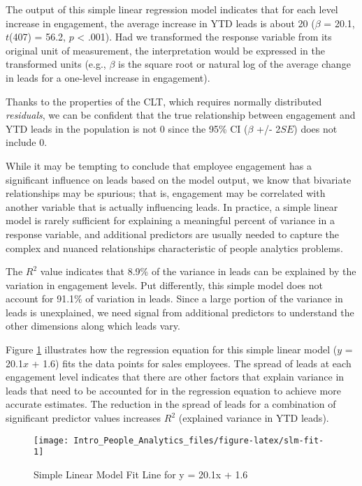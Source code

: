 \documentclass[
]{book}
\begin{document}
The output of this simple linear regression model indicates that for each level increase in engagement, the average increase in YTD leads is about 20 (\(\beta\) = 20.1, \(t\)(407) = 56.2, \(p\) \textless{} .001). Had we transformed the response variable from its original unit of measurement, the interpretation would be expressed in the transformed units (e.g., \(\beta\) is the square root or natural log of the average change in leads for a one-level increase in engagement).

Thanks to the properties of the CLT, which requires normally distributed \emph{residuals}, we can be confident that the true relationship between engagement and YTD leads in the population is not 0 since the 95\% CI (\(\beta\) +/- 2\(SE\)) does not include 0.

While it may be tempting to conclude that employee engagement has a significant influence on leads based on the model output, we know that bivariate relationships may be spurious; that is, engagement may be correlated with another variable that is actually influencing leads. In practice, a simple linear model is rarely sufficient for explaining a meaningful percent of variance in a response variable, and additional predictors are usually needed to capture the complex and nuanced relationships characteristic of people analytics problems.

The \(R^2\) value indicates that 8.9\% of the variance in leads can be explained by the variation in engagement levels. Put differently, this simple model does not account for 91.1\% of variation in leads. Since a large portion of the variance in leads is unexplained, we need signal from additional predictors to understand the other dimensions along which leads vary.

Figure \ref{fig:slm-fit} illustrates how the regression equation for this simple linear model (\(y\) = 20.1\(x\) + 1.6) fits the data points for sales employees. The spread of leads at each engagement level indicates that there are other factors that explain variance in leads that need to be accounted for in the regression equation to achieve more accurate estimates. The reduction in the spread of leads for a combination of significant predictor values increases \(R^2\) (explained variance in YTD leads).

\begin{figure}

{\centering \texttt{[image: Intro\_People\_Analytics\_files/figure-latex/slm-fit-1]} 

}

\caption{Simple Linear Model Fit Line for y = 20.1x + 1.6}\label{fig:slm-fit}
\end{figure}
\end{document}
